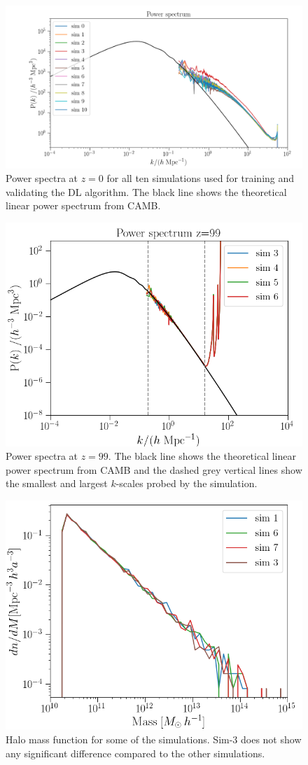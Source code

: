 \documentclass[11pt]{article}
\begin{document}
\begin{figure}[t]
\centering
\includegraphics[width=\columnwidth]{Pk_sims}
\caption{Power spectra at $z=0$ for all ten simulations used for training and validating the DL algorithm. The black line shows the theoretical linear power spectrum from CAMB.}
\label{fig:Pk_z0}
\end{figure}

\begin{figure}[t]
\centering
\includegraphics[width=0.7\columnwidth]{Pk_sims_z_99}
\caption{Power spectra at $z=99$. The black line shows the theoretical linear power spectrum from CAMB and the dashed grey vertical lines show the smallest and largest $k$-scales probed by the simulation.}
\label{fig:Pk_z99}
\end{figure}

\begin{figure}[t]
\centering
\includegraphics[width=0.7\columnwidth]{HMFs}
\caption{Halo mass function for some of the simulations. Sim-3 does not show any significant difference compared to the other simulations.}
\label{fig:HMF_sims}
\end{figure}
\end{document}
